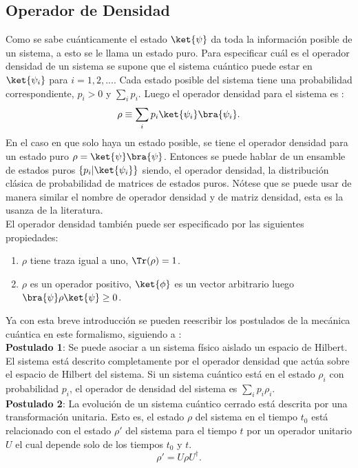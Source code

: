 \subsection{Operador de Densidad}
Como se sabe cuánticamente el estado $\ket{\psi}$ da toda la información posible de un sistema, a esto se le llama un estado puro. Para especificar cuál es el operador densidad de un sistema se supone que el sistema cuántico puede estar en $\ket{\psi_{i}}$ para $i=1,2,...$. Cada estado posible del sistema tiene una probabilidad correspondiente, $p_{i}>0$ y $\sum_{i} p_{i}$. Luego el operador densidad para el sistema es :
\begin{equation}
\rho \equiv \sum_{i} p_{i} \ket{\psi_{i}}\bra{\psi_{i}}.
\end{equation}
En el caso en que solo haya un estado posible, se tiene el operador densidad para un estado puro $\rho= \ket{\psi}\bra{\psi}$. Entonces se puede hablar de un ensamble de estados puros $ \{ p_{i} | \ket{\psi_{i}} \} $  siendo, el operador densidad, la distribución clásica de probabilidad de matrices de estados puros. Nótese que se puede usar de manera similar el nombre de operador densidad y de matriz densidad, esta es la usanza de la literatura. 
\\
El operador densidad también puede ser especificado por las siguientes propiedades: 

\begin{enumerate}
\item $\rho$ tiene traza igual a uno, $\Tr(\rho)=1$.

\item $\rho$ es un operador positivo, $\ket{\phi}$ es un vector arbitrario luego $\bra{\psi}\rho\ket{\psi} \geq 0$.
\end{enumerate}
Ya con esta breve introducción se pueden reescribir los postulados de la mecánica cuántica en este formalismo, siguiendo a \cite{NielsenInformation}:
\\
\textbf{Postulado 1}: Se puede asociar a un sistema físico aislado un espacio de Hilbert. El sistema está descrito completamente por el operador densidad que actúa sobre el espacio de Hilbert del sistema. Si un sistema cuántico está en el estado $\rho_{i}$ con probabilidad $p_{i}$, el operador de densidad del sistema es $\sum_{i} p_{i} \rho_{i}$.
\\

\textbf{Postulado 2}: La evolución de un sistema cuántico cerrado está descrita por una transformación unitaria. Esto es,  el estado $\rho$ del sistema en el tiempo $t_{0}$ está relacionado con el estado $\rho'$ del sistema para el tiempo $t$ por un operador unitario $U$ el cual depende solo de los tiempos $t_{0}$ y $t$. 
\begin{equation}
\rho' = U \rho U^{\dagger}.
\end{equation}
\\

